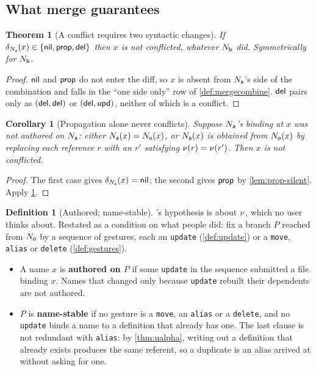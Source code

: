 \documentclass[11pt]{article}
\theoremstyle{definition}
\newtheorem{definition}{Definition}[section]
\theoremstyle{plain}
\newtheorem{theorem}{Theorem}[section]
\newtheorem{corollary}{Corollary}[section]
\theoremstyle{remark}
\begin{document}
\subsection{What merge guarantees}

\begin{theorem}[A conflict requires two syntactic changes]\label{thm:noconflict}
If $\delta_{N_{\mathsf{a}}}(x) \in \{\mathsf{nil}, \mathsf{prop}, \mathsf{del}\}$ then $x$ is not conflicted, whatever $N_{\mathsf{b}}$ did.
Symmetrically for $N_{\mathsf{b}}$.
\end{theorem}
\begin{proof}
$\mathsf{nil}$ and $\mathsf{prop}$ do not enter the diff, so $x$ is absent from $N_{\mathsf{a}}$'s side of the combination and
falls in the ``one side only'' row of \cref{def:mergecombine}. $\mathsf{del}$ pairs only as $(\mathsf{del},\mathsf{del})$
or $(\mathsf{del},\mathsf{upd})$, neither of which is a conflict.
\end{proof}

\begin{corollary}[Propagation alone never conflicts]\label{cor:noedit}
Suppose $N_{\mathsf{a}}$'s binding at $x$ was not authored on $N_{\mathsf{a}}$: either $N_{\mathsf{a}}(x) = N_{\mathsf{o}}(x)$, or $N_{\mathsf{a}}(x)$ is
obtained from $N_{\mathsf{o}}(x)$ by replacing each reference $r$ with an $r'$ satisfying
$\nu(r) = \nu(r')$. Then $x$ is not conflicted.
\end{corollary}
\begin{proof}
The first case gives $\delta_{N_{\mathsf{a}}}(x) = \mathsf{nil}$; the second gives $\mathsf{prop}$ by
\cref{lem:prop-silent}. Apply \cref{thm:noconflict}.
\end{proof}

\begin{definition}[Authored; name-stable]\label{def:namestable}
's hypothesis is about $\nu$, which no user thinks about. Restated as a condition
on what people did: fix a branch $P$ reached from $N_{\mathsf{o}}$ by a sequence of gestures, each an
\texttt{update} (\cref{def:update}) or a \texttt{move}, \texttt{alias} or \texttt{delete}
(\cref{def:gestures}).
\begin{itemize}[nosep]
  \item A name $x$ is \textbf{authored on $P$} if some \texttt{update} in the sequence submitted a
        file binding $x$. Names that changed only because \texttt{update} rebuilt their dependents
        are not authored.
  \item $P$ is \textbf{name-stable} if no gesture is a \texttt{move}, an \texttt{alias} or a
        \texttt{delete}, and no \texttt{update} binds a name to a definition that already has one.
        The last clause is not redundant with \texttt{alias}: by \cref{thm:ualpha}, writing out a
        definition that already exists produces the same referent, so a duplicate is an alias arrived
        at without asking for one.
\end{itemize}
\end{definition}
\end{document}
